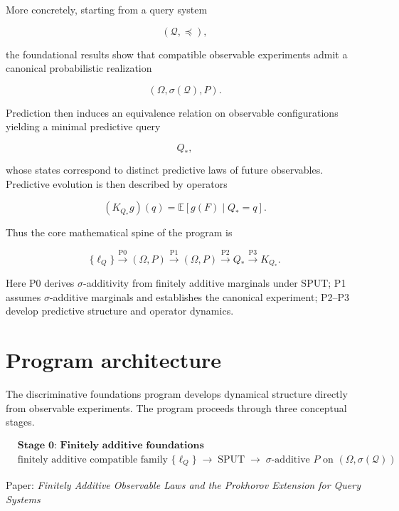 \documentclass[11pt]{article}
\begin{document}
More concretely, starting from a query system

\[
(\mathcal Q,\preceq),
\]

the foundational results show that compatible observable experiments
admit a canonical probabilistic realization

\[
(\Omega,\sigma(\mathcal Q),P).
\]

Prediction then induces an equivalence relation on observable
configurations yielding a minimal predictive query

\[
Q_*,
\]

whose states correspond to distinct predictive laws of future
observables.  Predictive evolution is then described by operators

\[
(K_{Q_*} g)(q)=\mathbb E[g(F)\mid Q_*=q].
\]

Thus the core mathematical spine of the program is

\[
\{\ell_Q\}
\xrightarrow{\text{P0}}
(\Omega,P)
\xrightarrow{\text{P1}}
(\Omega,P)
\xrightarrow{\text{P2}}
Q_*
\xrightarrow{\text{P3}}
K_{Q_*}.
\]

Here P0 derives $\sigma$-additivity from finitely additive marginals
under SPUT; P1 assumes $\sigma$-additive marginals and establishes
the canonical experiment; P2--P3 develop predictive structure and
operator dynamics.



\section{Program architecture}

The discriminative foundations program develops dynamical structure directly
from observable experiments.  The program proceeds through three
conceptual stages.

\[
\begin{aligned}
&\textbf{Stage 0: Finitely additive foundations} \\[6pt]
&\text{finitely additive compatible family }\{\ell_Q\}
\;\longrightarrow\;
\text{SPUT}
\;\longrightarrow\;
\text{$\sigma$-additive }P\text{ on }(\Omega,\sigma(\mathcal{Q}))
\end{aligned}
\]

\begin{center}
Paper: \emph{Finitely Additive Observable Laws and the Prokhorov Extension for Query Systems}
\end{center}
\end{document}
